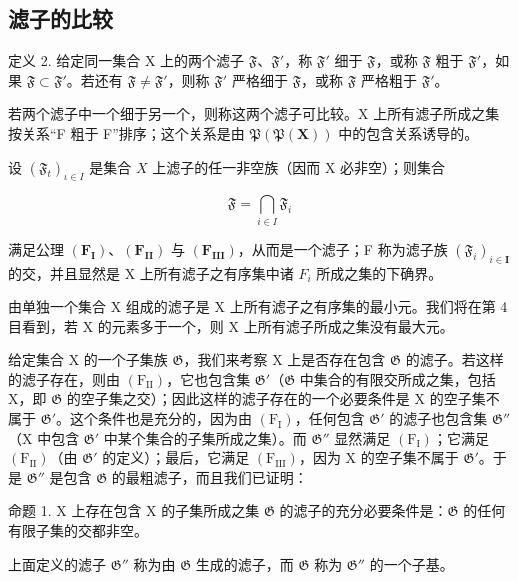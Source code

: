 \subsection{滤子的比较}

定义 2. 给定同一集合 X 上的两个滤子 \(\mathfrak{F}\)、\(\mathfrak{F}'\)，称 \(\mathfrak{F}'\) 细于 \(\mathfrak{F}\)，或称 \(\mathfrak{F}\) 粗于 \(\mathfrak{F}'\)，如果 \(\mathfrak{F} \subset \mathfrak{F}'\)。若还有 \(\mathfrak{F} \neq \mathfrak{F}'\)，则称 \(\mathfrak{F}'\) 严格细于 \(\mathfrak{F}\)，或称 \(\mathfrak{F}\) 严格粗于 \(\mathfrak{F}'\)。

若两个滤子中一个细于另一个，则称这两个滤子可比较。X 上所有滤子所成之集按关系“F 粗于 F”排序；这个关系是由 \(\mathfrak{P}(\mathfrak{P}(\mathbf{X}))\) 中的包含关系诱导的。

设 \((\mathfrak{F}_t)_{\iota \in I}\) 是集合 \(X\) 上滤子的任一非空族（因而 X 必非空）；则集合

\[
\mathfrak {F} = \bigcap_ {i \in I} \mathfrak {F} _ {i}
\]

满足公理 \((\mathbf{F}_{\mathbf{I}})\)、\((\mathbf{F}_{\mathbf{II}})\) 与 \((\mathbf{F}_{\mathbf{III}})\)，从而是一个滤子；F 称为滤子族 \((\mathfrak{F}_{i})_{i\in\mathbf{I}}\) 的交，并且显然是 X 上所有滤子之有序集中诸 \(F_{i}\) 所成之集的下确界。

由单独一个集合 X 组成的滤子是 X 上所有滤子之有序集的最小元。我们将在第 4 目看到，若 X 的元素多于一个，则 X 上所有滤子所成之集没有最大元。

给定集合 X 的一个子集族 \(\mathfrak{G}\)，我们来考察 X 上是否存在包含 \(\mathfrak{G}\) 的滤子。若这样的滤子存在，则由 \((\mathrm{F}_{\mathrm{II}})\)，它也包含集 \(\mathfrak{G}'\)（\(\mathfrak{G}\) 中集合的有限交所成之集，包括 X，即 \(\mathfrak{G}\) 的空子集之交）；因此这样的滤子存在的一个必要条件是 X 的空子集不属于 \(\mathfrak{G}'\)。这个条件也是充分的，因为由 \((\mathrm{F}_{\mathrm{I}})\)，任何包含 \(\mathfrak{G}'\) 的滤子也包含集 \(\mathfrak{G}''\)（X 中包含 \(\mathfrak{G}'\) 中某个集合的子集所成之集）。而 \(\mathfrak{G}''\) 显然满足 \((\mathrm{F}_{\mathrm{I}})\)；它满足 \((\mathrm{F}_{\mathrm{II}})\)（由 \(\mathfrak{G}'\) 的定义）；最后，它满足 \((\mathrm{F}_{\mathrm{III}})\)，因为 X 的空子集不属于 \(\mathfrak{G}'\)。于是 \(\mathfrak{G}''\) 是包含 \(\mathfrak{G}\) 的最粗滤子，而且我们已证明：

命题 1. X 上存在包含 X 的子集所成之集 \(\mathfrak{G}\) 的滤子的充分必要条件是：\(\mathfrak{G}\) 的任何有限子集的交都非空。

上面定义的滤子 \(\mathfrak{G}''\) 称为由 \(\mathfrak{G}\) 生成的滤子，而 \(\mathfrak{G}\) 称为 \(\mathfrak{G}''\) 的一个子基。

